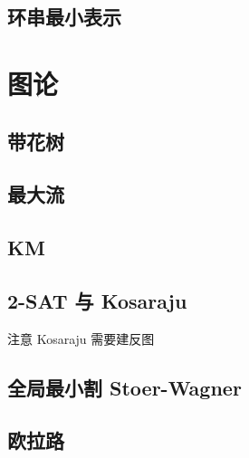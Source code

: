 \documentclass[landscape, twocolumn, 8pt, a4paper, twoside]{extarticle}
\begin{document}
  \subsection{环串最小表示}
    

\section{图论}
  \subsection{带花树}
    

  \subsection{最大流}
    
  
%    
  
  \subsection{KM}
    

  \subsection{2-SAT 与 Kosaraju}
    注意 Kosaraju 需要建反图
    

  \subsection{全局最小割 Stoer-Wagner}
    

%    

  \subsection{欧拉路}
    
\end{document}
